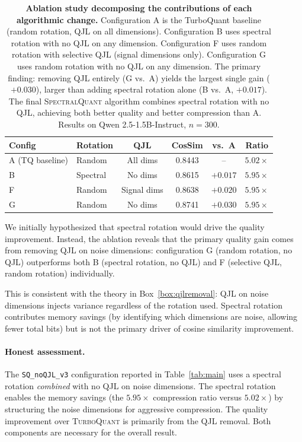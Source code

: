 \documentclass[11pt]{article}
\newcommand{\TQ}{\textsc{TurboQuant}}
\newcommand{\SQ}{\textsc{SpectralQuant}}
\begin{document}
\begin{table}[!htbp]
\centering
\caption{\textbf{Ablation study decomposing the contributions of each
algorithmic change.}  Configuration A is the TurboQuant baseline (random
rotation, QJL on all dimensions).  Configuration B uses spectral rotation with
no QJL on any dimension.  Configuration F uses random rotation with selective
QJL (signal dimensions only).  Configuration G uses random rotation with no
QJL on any dimension.  The primary finding: removing QJL entirely (G
vs.\ A) yields the largest single gain ($+0.030$), larger than adding spectral
rotation alone (B vs.\ A, $+0.017$).  The final \SQ{} algorithm combines
spectral rotation with no QJL, achieving both better quality and better
compression than A.  Results on Qwen 2.5-1.5B-Instruct, $n = 300$.}
\label{tab:ablation}
\begin{tabular}{llcccc}
\toprule
\textbf{Config} & \textbf{Rotation} & \textbf{QJL} & \textbf{CosSim} & \textbf{vs.\ A} & \textbf{Ratio} \\
\midrule
A (TQ baseline) & Random  & All dims    & 0.8443 & --     & $5.02\times$ \\
B               & Spectral & No dims    & 0.8615 & $+0.017$ & $5.95\times$ \\
F               & Random  & Signal dims & 0.8638 & $+0.020$ & $5.95\times$ \\
G               & Random  & No dims     & 0.8741 & $\mathbf{+0.030}$ & $5.95\times$ \\
\bottomrule
\end{tabular}
\end{table}

We initially hypothesized that spectral rotation would drive the quality
improvement.  Instead, the ablation reveals that the primary quality gain comes
from removing QJL on noise dimensions: configuration G (random rotation, no
QJL) outperforms both B (spectral rotation, no QJL) and F (selective QJL,
random rotation) individually.

This is consistent with the theory in Box~\ref{box:qjlremoval}: QJL on noise
dimensions injects variance regardless of the rotation used.  Spectral
rotation contributes memory savings (by identifying which dimensions are noise,
allowing fewer total bits) but is not the primary driver of cosine similarity
improvement.

\paragraph{Honest assessment.}
The \texttt{SQ\_noQJL\_v3} configuration reported in Table~\ref{tab:main}
uses a spectral rotation \emph{combined} with no QJL on noise dimensions.  The
spectral rotation enables the memory savings (the $5.95\times$ compression
ratio versus $5.02\times$) by structuring the noise dimensions for aggressive
compression.  The quality improvement over \TQ{} is primarily from the QJL
removal.  Both components are necessary for the overall result.
\end{document}
